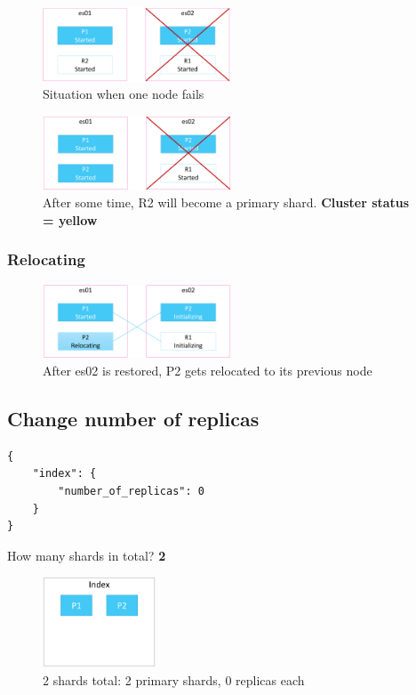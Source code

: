 \documentclass{article}
\begin{document}
\begin{figure}[H]
    \centering
    \includegraphics[width=0.5\textwidth]{shard-alloc-started3.png}
    \caption{Situation when one node fails}
\end{figure}
\begin{figure}[H]
    \centering
    \includegraphics[width=0.5\textwidth]{shard-alloc-started4.png}
    \caption{After some time, R2 will become a primary shard. \textbf{Cluster status = yellow}}
\end{figure}

\subsubsection{Relocating}

\begin{figure}[H]
    \centering
    \includegraphics[width=0.5\textwidth]{shard-alloc-relocating.png}
    \caption{After es02 is restored, P2 gets relocated to its previous node}
\end{figure}

\subsection{Change number of replicas}

\begin{verbatim}
{
    "index": {
        "number_of_replicas": 0
    }
}
\end{verbatim}

How many shards in total? \textbf{2}

\begin{figure}[H]
    \centering
    \includegraphics[width=0.3\textwidth]{change-number-of-replicas.png}
    \caption{2 shards total: 2 primary shards, 0 replicas each}
\end{figure}
\end{document}
